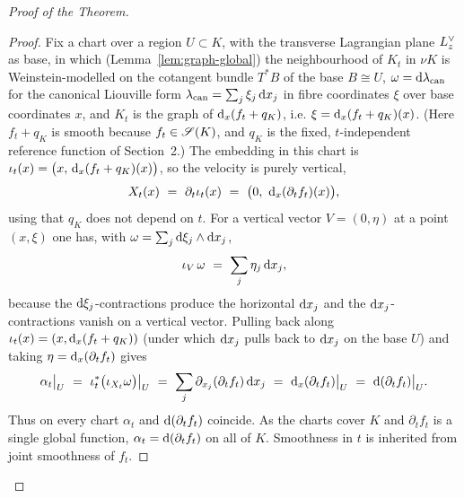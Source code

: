 \begin{proof}[Proof of the Theorem]
\begin{proof}
Fix a chart over a region $U\subset K$, with the transverse Lagrangian plane
$L^{\vee}_z$ as base, in which (Lemma~\ref{lem:graph-global}) the neighbourhood of
$K_t$ in $\nu K$ is Weinstein-modelled on the cotangent bundle $T^{*}B$ of the base
$B\cong U$, $\omega=\mathrm d\lambda_{\mathrm{can}}$ for the canonical Liouville form
$\lambda_{\mathrm{can}}=\sum_j \xi_j\,\mathrm d x_j$ in fibre coordinates $\xi$ over base
coordinates $x$, and $K_t$ is the graph of $\mathrm d_x(f_t+q_K)$, i.e.
$\xi=\mathrm d_x(f_t+q_K)(x)$. (Here $f_t+q_K$ is smooth because $f_t\in\mathscr S(K)$, and
$q_K$ is the fixed, $t$-independent reference function of Section~2.) The embedding
in this chart is $\iota_t(x)=\bigl(x,\,\mathrm d_x(f_t+q_K)(x)\bigr)$, so the velocity
is purely vertical,
\[
X_t(x)\ =\ \partial_t\iota_t(x)\ =\ \bigl(0,\ \qeightdd_x(\partial_t f_t)(x)\bigr),
\]
using that $q_K$ does not depend on $t$. For a vertical vector
$V=(0,\eta)$ at a point $(x,\xi)$ one has, with
$\omega=\sum_j \mathrm d\xi_j\wedge\mathrm d x_j$,
\[
\iota_{V}\,\omega\ =\ \sum_j \eta_j\,\mathrm d x_j ,
\]
because the $\mathrm d\xi_j$-contractions produce the horizontal $\mathrm d x_j$ and the
$\mathrm d x_j$-contractions vanish on a vertical vector. Pulling back along
$\iota_t(x)=(x,\mathrm d_x(f_t+q_K))$ (under which $\mathrm d x_j$ pulls back to $\mathrm d x_j$ on
the base $U$) and taking $\eta=\mathrm d_x(\partial_t f_t)$ gives
\[
\alpha_t\big|_U\ =\ \iota_t^{*}\bigl(\iota_{X_t}\omega\bigr)\big|_U
\ =\ \sum_j \partial_{x_j}(\partial_t f_t)\,\qeightdd x_j
\ =\ \qeightdd_x(\partial_t f_t)\big|_U
\ =\ \qeightdd(\partial_t f_t)\big|_U .
\]
Thus on every chart $\alpha_t$ and $\mathrm d(\partial_t f_t)$ coincide. As the charts
cover $K$ and $\partial_t f_t$ is a single global function, $\alpha_t=\mathrm d(\partial_t f_t)$
on all of $K$. Smoothness in $t$ is inherited from joint smoothness of $f_t$.
\end{proof}


\end{proof}

